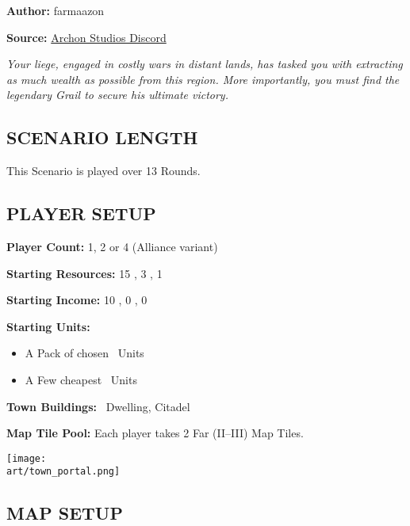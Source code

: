 
\begin{multicols*}{2}

\textbf{Author:} farmaazon

\textbf{Source:} \href{https://discordapp.com/channels/740870068178649108/1344400556717768865/1344400556717768865}{Archon Studios Discord}

\textit{Your liege, engaged in costly wars in distant lands, has tasked you with extracting as much wealth as possible from this region. More importantly, you must find the legendary Grail to secure his ultimate victory.}

\subsection*{\MakeUppercase{Scenario Length}}

This Scenario is played over 13 Rounds.

\subsection*{\MakeUppercase{Player Setup}}

\textbf{Player Count:} 1, 2 or 4 (Alliance variant)

\textbf{Starting Resources:} 15 , 3 , 1 

\textbf{Starting Income:} 10 , 0 , 0 

\textbf{Starting Units:}
\begin{itemize}
  \item A Pack of chosen \bronze\ Units
  \item A Few cheapest \silver\ Units
\end{itemize}

\textbf{Town Buildings:} \bronze\ Dwelling, Citadel

\textbf{Map Tile Pool:} Each player takes 2 Far (II--III) Map Tiles.

\begin{center}
  {\texttt{[image: \\art/town\_portal.png]}}
\end{center}

\subsection*{\MakeUppercase{Map Setup}}


\end{multicols*}
